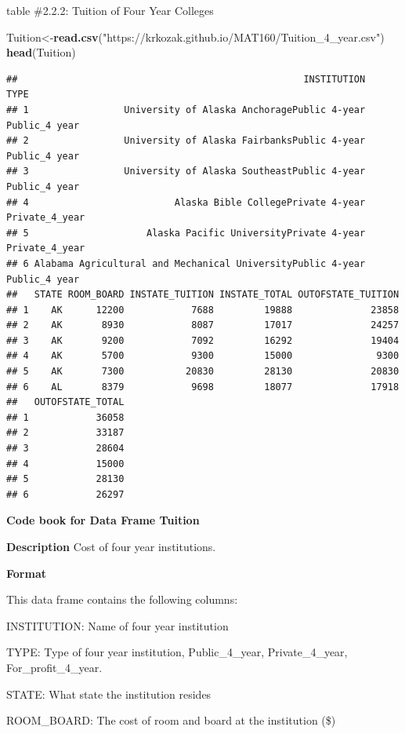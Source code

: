 \documentclass[
]{book}
\newenvironment{Shaded}{\begin{snugshade}}{\end{snugshade}}
\newcommand{\KeywordTok}[1]{\textcolor[rgb]{0.13,0.29,0.53}{\textbf{#1}}}
\newcommand{\NormalTok}[1]{#1}
\newcommand{\StringTok}[1]{\textcolor[rgb]{0.31,0.60,0.02}{#1}}
\begin{document}
table \#2.2.2: Tuition of Four Year Colleges

\begin{Shaded}
\begin{Highlighting}[]
\NormalTok{Tuition<-}\KeywordTok{read.csv}\NormalTok{(}\StringTok{"https://krkozak.github.io/MAT160/Tuition_4_year.csv"}\NormalTok{)}
\KeywordTok{head}\NormalTok{(Tuition)}
\end{Highlighting}
\end{Shaded}

\begin{verbatim}
##                                                   INSTITUTION           TYPE
## 1                 University of Alaska AnchoragePublic 4-year  Public_4 year
## 2                 University of Alaska FairbanksPublic 4-year  Public_4 year
## 3                 University of Alaska SoutheastPublic 4-year  Public_4 year
## 4                          Alaska Bible CollegePrivate 4-year Private_4_year
## 5                     Alaska Pacific UniversityPrivate 4-year Private_4_year
## 6 Alabama Agricultural and Mechanical UniversityPublic 4-year  Public_4 year
##   STATE ROOM_BOARD INSTATE_TUITION INSTATE_TOTAL OUTOFSTATE_TUITION
## 1    AK      12200            7688         19888              23858
## 2    AK       8930            8087         17017              24257
## 3    AK       9200            7092         16292              19404
## 4    AK       5700            9300         15000               9300
## 5    AK       7300           20830         28130              20830
## 6    AL       8379            9698         18077              17918
##   OUTOFSTATE_TOTAL
## 1            36058
## 2            33187
## 3            28604
## 4            15000
## 5            28130
## 6            26297
\end{verbatim}

\textbf{Code book for Data Frame Tuition}

\textbf{Description}
Cost of four year institutions.

\textbf{Format}

This data frame contains the following columns:

INSTITUTION: Name of four year institution

TYPE: Type of four year institution, Public\_4\_year, Private\_4\_year, For\_profit\_4\_year.

STATE: What state the institution resides

ROOM\_BOARD: The cost of room and board at the institution (\$)
\end{document}
